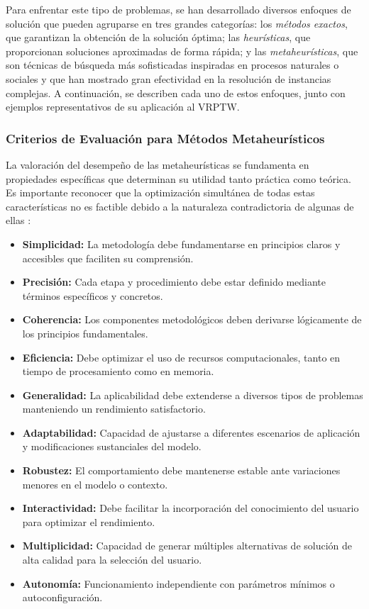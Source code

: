 \documentclass[12pt,titlepage,twoside,openright]{book}
\begin{document}
Para enfrentar este tipo de problemas, se han desarrollado diversos enfoques de solución que pueden agruparse en tres grandes categorías: los \textit{métodos exactos}, que garantizan la obtención de la solución óptima; las \textit{heurísticas}, que proporcionan soluciones aproximadas de forma rápida; y las \textit{metaheurísticas}, que son técnicas de búsqueda más sofisticadas inspiradas en procesos naturales o sociales y que han mostrado gran efectividad en la resolución de instancias complejas. A continuación, se describen cada uno de estos enfoques, junto con ejemplos representativos de su aplicación al VRPTW.

\subsubsection*{Criterios de Evaluación para Métodos Metaheurísticos}

La valoración del desempeño de las metaheurísticas se fundamenta en propiedades específicas que determinan su utilidad tanto práctica como teórica. Es importante reconocer que la optimización simultánea de todas estas características no es factible debido a la naturaleza contradictoria de algunas de ellas \citep{antonioSuarez2014}:

\begin{itemize}
	\item \textbf{Simplicidad:} La metodología debe fundamentarse en principios claros y accesibles que faciliten su comprensión.
	\item \textbf{Precisión:} Cada etapa y procedimiento debe estar definido mediante términos específicos y concretos.
	\item \textbf{Coherencia:} Los componentes metodológicos deben derivarse lógicamente de los principios fundamentales.
	\item \textbf{Eficiencia:} Debe optimizar el uso de recursos computacionales, tanto en tiempo de procesamiento como en memoria.
	\item \textbf{Generalidad:} La aplicabilidad debe extenderse a diversos tipos de problemas manteniendo un rendimiento satisfactorio.
	\item \textbf{Adaptabilidad:} Capacidad de ajustarse a diferentes escenarios de aplicación y modificaciones sustanciales del modelo.
	\item \textbf{Robustez:} El comportamiento debe mantenerse estable ante variaciones menores en el modelo o contexto.
	\item \textbf{Interactividad:} Debe facilitar la incorporación del conocimiento del usuario para optimizar el rendimiento.
	\item \textbf{Multiplicidad:} Capacidad de generar múltiples alternativas de solución de alta calidad para la selección del usuario.
	\item \textbf{Autonomía:} Funcionamiento independiente con parámetros mínimos o autoconfiguración.
\end{itemize}
\end{document}
